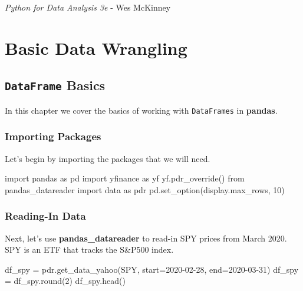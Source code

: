 \documentclass[
  letterpaper,
  DIV=11,
  numbers=noendperiod]{scrreprt}
\newenvironment{Shaded}{\begin{snugshade}}{\end{snugshade}}
\newcommand{\BuiltInTok}[1]{\textcolor[rgb]{0.00,0.23,0.31}{#1}}
\newcommand{\DecValTok}[1]{\textcolor[rgb]{0.68,0.00,0.00}{#1}}
\newcommand{\ImportTok}[1]{\textcolor[rgb]{0.00,0.46,0.62}{#1}}
\newcommand{\NormalTok}[1]{\textcolor[rgb]{0.00,0.23,0.31}{#1}}
\newcommand{\OperatorTok}[1]{\textcolor[rgb]{0.37,0.37,0.37}{#1}}
\newcommand{\StringTok}[1]{\textcolor[rgb]{0.13,0.47,0.30}{#1}}
\begin{document}
\emph{Python for Data Analysis 3e} - Wes McKinney

\part{Basic Data Wrangling}

\hypertarget{dataframe-basics}{%
\chapter{\texorpdfstring{\texttt{DataFrame}
Basics}{DataFrame Basics}}\label{dataframe-basics}}

In this chapter we cover the basics of working with \texttt{DataFrames}
in \textbf{pandas}.

\hypertarget{importing-packages-1}{%
\section{Importing Packages}\label{importing-packages-1}}

Let's begin by importing the packages that we will need.

\begin{Shaded}
\begin{Highlighting}[]
\ImportTok{import}\NormalTok{ pandas }\ImportTok{as}\NormalTok{ pd}
\ImportTok{import}\NormalTok{ yfinance }\ImportTok{as}\NormalTok{ yf}
\NormalTok{yf.pdr\_override()}
\ImportTok{from}\NormalTok{ pandas\_datareader }\ImportTok{import}\NormalTok{ data }\ImportTok{as}\NormalTok{ pdr}
\NormalTok{pd.set\_option(}\StringTok{\textquotesingle{}display.max\_rows\textquotesingle{}}\NormalTok{, }\DecValTok{10}\NormalTok{)}
\end{Highlighting}
\end{Shaded}

\hypertarget{reading-in-data}{%
\section{Reading-In Data}\label{reading-in-data}}

Next, let's use \textbf{pandas\_datareader} to read-in SPY prices from
March 2020. SPY is an ETF that tracks the S\&P500 index.

\begin{Shaded}
\begin{Highlighting}[]
\NormalTok{df\_spy }\OperatorTok{=}\NormalTok{ pdr.get\_data\_yahoo(}\StringTok{\textquotesingle{}SPY\textquotesingle{}}\NormalTok{, start}\OperatorTok{=}\StringTok{\textquotesingle{}2020{-}02{-}28\textquotesingle{}}\NormalTok{, end}\OperatorTok{=}\StringTok{\textquotesingle{}2020{-}03{-}31\textquotesingle{}}\NormalTok{)}
\NormalTok{df\_spy }\OperatorTok{=}\NormalTok{ df\_spy.}\BuiltInTok{round}\NormalTok{(}\DecValTok{2}\NormalTok{)}
\NormalTok{df\_spy.head()}
\end{Highlighting}
\end{Shaded}
\end{document}
